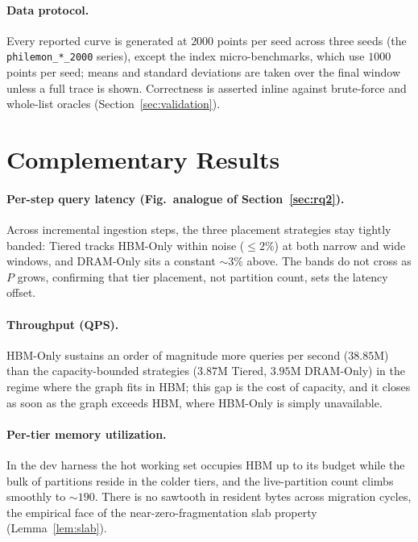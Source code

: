 \documentclass[10pt]{article}
\theoremstyle{definition}
\begin{document}
\paragraph{Data protocol.}
Every reported curve is generated at $2000$ points per seed across three seeds (the
\texttt{philemon\_*\_2000} series), except the index micro-benchmarks, which use
$1000$ points per seed; means and standard deviations are taken over the final window
unless a full trace is shown. Correctness is asserted inline against brute-force and
whole-list oracles (Section~\ref{sec:validation}).

\section{Complementary Results}
\label{app:complementary}

\paragraph{Per-step query latency (Fig.\ analogue of Section~\ref{sec:rq2}).}
Across incremental ingestion steps, the three placement strategies stay tightly
banded: Tiered tracks HBM-Only within noise ($\le 2\%$) at both narrow and wide
windows, and DRAM-Only sits a constant ${\sim}3\%$ above. The bands do not cross as
$P$ grows, confirming that tier placement, not partition count, sets the latency
offset.

\paragraph{Throughput (QPS).}
HBM-Only sustains an order of magnitude more queries per second ($38.85$M) than the
capacity-bounded strategies ($3.87$M Tiered, $3.95$M DRAM-Only) in the regime where
the graph fits in HBM; this gap is the cost of capacity, and it closes as soon as the
graph exceeds HBM, where HBM-Only is simply unavailable.

\paragraph{Per-tier memory utilization.}
In the dev harness the hot working set occupies HBM up to its budget while the bulk of
partitions reside in the colder tiers, and the live-partition count climbs smoothly to
${\sim}190$. There is no sawtooth in resident bytes across migration cycles, the
empirical face of the near-zero-fragmentation slab property (Lemma~\ref{lem:slab}).
\end{document}
